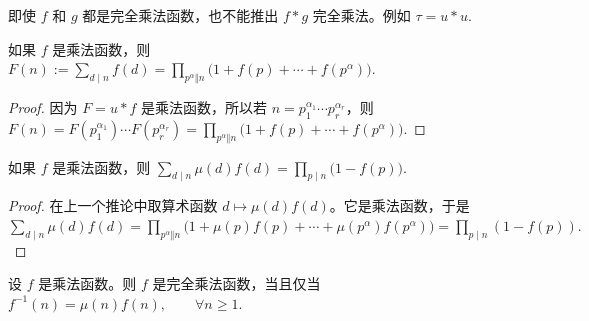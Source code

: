 \begin{remark}
	即使 $f$ 和 $g$ 都是完全乘法函数，也不能推出 $f*g$ 完全乘法。例如
	\(\textstyle \tau=\allowbreak{}u*u.\)
\end{remark}

\begin{corollary}
	如果 $f$ 是乘法函数，则
	\(\textstyle F(n):=\allowbreak{}\sum_{d\mid\allowbreak{} n}f(d) =\allowbreak{} \prod_{p^\alpha\Vert n}\bigl(1+\allowbreak{}f(p)+\allowbreak{}\cdots+\allowbreak{}f(p^\alpha)\bigr).\)
\end{corollary}

\begin{proof}
	因为 $F=u*f$ 是乘法函数，所以若 $n=p_1^{\alpha_1}\cdots p_r^{\alpha_r}$，则
	\(\textstyle F(n) =\allowbreak{} F(p_1^{\alpha_1})\cdots F(p_r^{\alpha_r}) =\allowbreak{} \prod_{p^\alpha\Vert n}\bigl(1+\allowbreak{}f(p)+\allowbreak{}\cdots+\allowbreak{}f(p^\alpha)\bigr).\)
\end{proof}

\begin{corollary}
	如果 $f$ 是乘法函数，则
	\(\textstyle \sum_{d\mid\allowbreak{} n}\mu(d)f(d) =\allowbreak{} \prod_{p\mid\allowbreak{} n}\bigl(1-f(p)\bigr).\)
\end{corollary}

\begin{proof}
	在上一个推论中取算术函数 $d\mapsto \mu(d)f(d)$。它是乘法函数，于是
	\(\textstyle \sum_{d\mid\allowbreak{} n}\mu(d)f(d) =\allowbreak{} \prod_{p^\alpha\Vert n} \bigl(1+\allowbreak{}\mu(p)f(p)+\allowbreak{}\cdots+\allowbreak{}\mu(p^\alpha)f(p^\alpha)\bigr) =\allowbreak{} \prod_{p\mid\allowbreak{} n}(1-f(p)).\)
\end{proof}



\begin{theorem}
	设 $f$ 是乘法函数。则 $f$ 是完全乘法函数，当且仅当
	\(\textstyle f^{-1}(n)=\allowbreak{}\mu(n)f(n),\allowbreak{}\qquad \forall n\geq\allowbreak{} 1.\)
\end{theorem}

